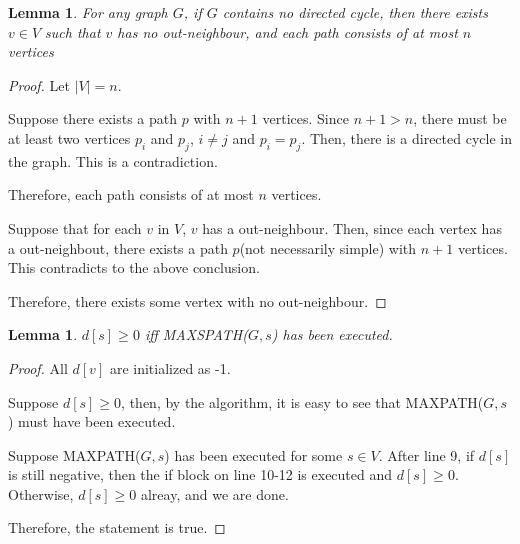 \documentclass[10pt]{article}
\newtheorem{lemma}[theorem]{Lemma}
\begin{document}
\begin{lemma}
	For any graph $G$, if $G$ contains no directed cycle, then there exists $v
	\in V$ such that $v$ has no out-neighbour, and each path consists
	of at most $n$ vertices
\end{lemma}
\begin{proof}
	Let $|V| = n$.

	Suppose there exists a path $p$ with $n+1$ vertices.
	Since $n+1 > n$, there must be at least two vertices $p_i$ and $p_j$, $i
	\neq j$ and $p_i = p_j$.
	Then, there is a directed cycle in the graph.
	This is a contradiction.
	
	Therefore, each path consists of at most $n$ vertices. 
	
	Suppose that for each $v$ in $V$, $v$ has a out-neighbour.
	Then, since each vertex has a out-neighbout, there exists a path $p$(not
	necessarily simple) with $n+1$ vertices.
	This contradicts to the above conclusion. 

	Therefore, there exists some vertex with no out-neighbour.
\end{proof}

\begin{lemma}
	$d[s] \geq 0$ iff MAXSPATH($G, s$) has been executed.
\end{lemma}
\begin{proof}
	All $d[v]$ are initialized as -1.

	Suppose $d[s] \geq 0$, then, by the algorithm, it is easy to see that
	MAXPATH($G,s$) must have been executed.

	Suppose MAXPATH($G,s$) has been executed for some $s \in V$.
	After line 9, if $d[s]$ is still negative, then the if block on line 10-12
	is executed and $d[s] \geq 0$.
	Otherwise, $d[s] \geq 0$ alreay, and we are done.

	Therefore, the statement is true.
\end{proof}
\end{document}

